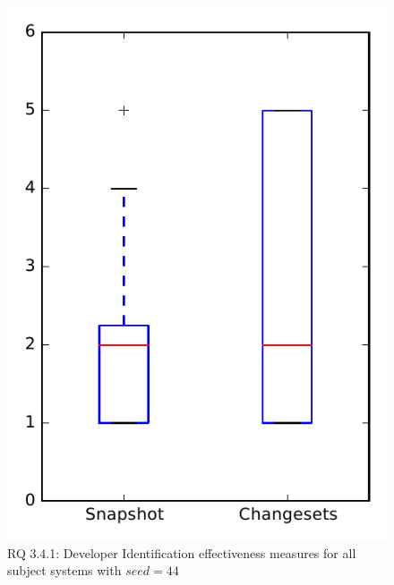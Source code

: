 
\begin{figure}
\centering
\includegraphics[height=0.4\textheight]{figures/dit_seed/rq1_overview_44}
\caption{RQ 3.4.1: Developer Identification effectiveness measures for all subject systems with $seed=44$}
\label{fig:dit_seed:rq1:overview}
\end{figure}
